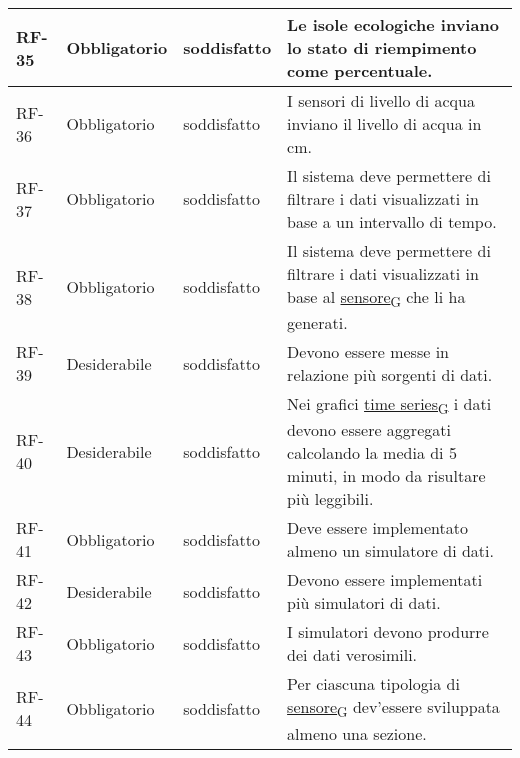 \begin{longtable}{|>{\centering\arraybackslash}m{}|>{\centering\arraybackslash}m{}|>{\centering\arraybackslash}m{}|>{\centering\arraybackslash}m{}|}
	RF-35           & Obbligatorio        & soddisfatto                                                                                                           & Le isole ecologiche inviano lo stato di riempimento come percentuale.
	\\\hline
	RF-36           & Obbligatorio        & soddisfatto                                                                                                           & I sensori di livello di acqua inviano il livello di acqua in cm.
	\\\hline
	RF-37           & Obbligatorio        & soddisfatto                                                                                                           & Il sistema deve permettere di filtrare i dati visualizzati in base a un intervallo di tempo.
	\\\hline
	RF-38           & Obbligatorio        & soddisfatto                                                                                                           & Il sistema deve permettere di filtrare i dati visualizzati in base al \href{https://7last.github.io/docs/pb/documentazione-interna/glossario\#sensore}{sensore\textsubscript{G}} che li ha generati.
	\\\hline
	RF-39           & Desiderabile        & soddisfatto                                                                                                           & Devono essere messe in relazione più sorgenti di dati.
	\\\hline
	RF-40           & Desiderabile        & soddisfatto                                                                                                           & Nei grafici \href{https://7last.github.io/docs/pb/documentazione-interna/glossario\#time-series}{time series\textsubscript{G}} i dati devono essere aggregati calcolando la media di 5 minuti, in modo da risultare più leggibili.
	\\\hline
	RF-41           & Obbligatorio        & soddisfatto & Deve essere implementato almeno un simulatore di dati.
	\\\hline
	RF-42           & Desiderabile        & soddisfatto & Devono essere implementati più simulatori di dati.
	\\\hline
	RF-43           & Obbligatorio        & soddisfatto & I simulatori devono produrre dei dati verosimili.
	\\\hline
	RF-44           & Obbligatorio        & soddisfatto & Per ciascuna tipologia di \href{https://7last.github.io/docs/pb/documentazione-interna/glossario\#sensore}{sensore\textsubscript{G}} dev'essere sviluppata almeno una sezione.

\end{longtable}
